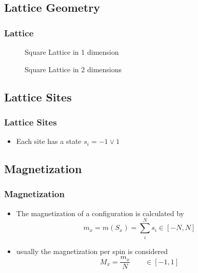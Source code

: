 \documentclass{beamer}
\newcommand{\tikzfigC}[2]{\begin{figure}[h]\begin{center}\end{center}\caption{{#2}}\end{figure}}
\begin{document}
\subsection{Lattice Geometry}
\begin{frame}\frametitle{Lattice}
\tikzfigC{Ising1D}{Square Lattice in 1 dimension}
\vspace*{0.25cm}
\tikzfigC{Ising2D}{Square Lattice in 2 dimensions}
\end{frame}

\subsection{Lattice Sites}
\begin{frame}\frametitle{Lattice Sites}
\begin{itemize}
\item Each site has a state $s_i = -1\lor1$
\end{itemize}
\end{frame}





\subsection{Magnetization}
\begin{frame}\frametitle{Magnetization}
\begin{itemize}
\item The magnetization of a configuration is calculated by \[m_x = m(S_x) = \sum_i^N s_i \in[-N,N]\]
\item usually the magnetization per spin is considered \[M_x =\frac{m_x}{N} \qquad\in[-1,1]\]
\end{itemize}
\end{frame}
\end{document}

